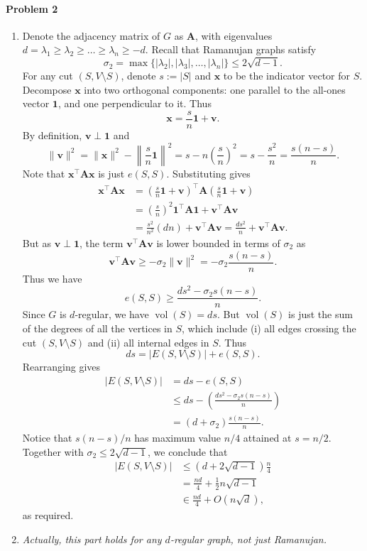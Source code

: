 \documentclass[12pt]{article}
\DeclareMathOperator{\vol}{vol}
\newcommand{\A}{\mathbf{A}}
\newcommand{\x}{\mathbf{x}}
\begin{document}
\paragraph{Problem 2}
\begin{enumerate}[label=\alph*., font=\bfseries]
\item Denote the adjacency matrix of $G$ as $\A$, with eigenvalues $d=\lambda_1\ge\lambda_2\ge\dots\ge\lambda_n\ge-d$. Recall that Ramanujan graphs satisfy $$\sigma_2=\max\{|\lambda_2|,|\lambda_3|,\dots,|\lambda_n|\}\le2\sqrt{d-1}.$$
For any cut $(S,V\setminus S)$, denote $s:=|S|$ and $\x$ to be the indicator vector for $S$. Decompose $\mathbf{x}$ into two orthogonal components: one parallel to the all-ones vector $\mathbf{1}$, and one perpendicular to it. Thus $$\mathbf{x} = \frac{s}{n}\mathbf{1} + \mathbf{v}.$$
By definition, $\mathbf{v} \perp \mathbf{1}$ and $$\|\mathbf{v}\|^2 = \|\mathbf{x}\|^2 - \left\| \frac{s}{n}\mathbf{1} \right\|^2 = s - n\left(\frac{s}{n}\right)^2 = s - \frac{s^2}{n} = \frac{s(n-s)}{n}.$$
Note that $\mathbf{x}^\top \A \mathbf{x}$ is just $e(S, S)$. Substituting gives
\begin{align*}
\mathbf{x}^\top \A \mathbf{x} &= \left( \frac{s}{n}\mathbf{1} + \mathbf{v} \right)^\top \A \left( \frac{s}{n}\mathbf{1} + \mathbf{v} \right)\\
&= \left(\frac{s}{n}\right)^2 \mathbf{1}^\top \A \mathbf{1} + \mathbf{v}^\top \A \mathbf{v}\\
&= \frac{s^2}{n^2}(dn) + \mathbf{v}^\top \A \mathbf{v} = \frac{ds^2}{n} + \mathbf{v}^\top \A \mathbf{v}.
\end{align*}
But as $\mathbf{v} \perp \mathbf{1}$, the term $\mathbf{v}^\top \A \mathbf{v}$ is lower bounded in terms of $\sigma_2$ as
$$\mathbf{v}^\top \A \mathbf{v} \ge -\sigma_2 \|\mathbf{v}\|^2 = -\sigma_2 \frac{s(n-s)}{n}.$$
Thus we have
$$e(S,S) \ge \frac{ds^2 - \sigma_2 s(n-s)}{n}.$$
Since $G$ is $d$-regular, we have $\vol(S)=ds$. But $\vol(S)$ is just the sum of the degrees of all the vertices in $S$, which include (i) all edges crossing the cut $(S, V\setminus S)$ and (ii) all internal edges in $S$. Thus
$$ds = |E(S, V \setminus S)| + e(S, S).$$
Rearranging gives
\begin{align*}
|E(S, V \setminus S)| &= ds - e(S, S)\\
&\le ds - \left( \frac{ds^2 - \sigma_2 s(n-s)}{n} \right)\\
&= \left(d + \sigma_2\right) \frac{s(n-s)}{n}.
\end{align*}
Notice that $s(n-s)/n$ has maximum value $n/4$ attained at $s=n/2$. Together with $\sigma_2\le2\sqrt{d-1}$, we conclude that
\begin{align*}
|E(S, V \setminus S)| &\le \left(d + 2\sqrt{d-1}\right) \frac{n}{4}\\
&=\frac{nd}{4}+\frac{1}{2}n\sqrt{d-1}\\
&\in \frac{nd}{4}+O\left(n\sqrt d\right),
\end{align*}
as required.
\item \textit{Actually, this part holds for any $d$-regular graph, not just Ramanujan.}


\end{enumerate}
\end{document}
